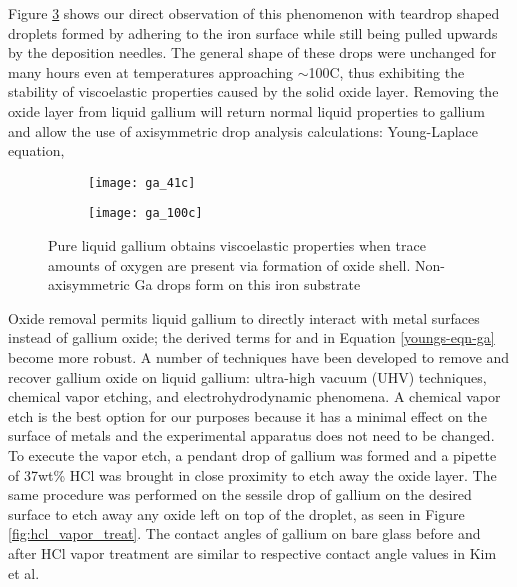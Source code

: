 Figure \ref{fig:deformed_ga} shows our direct observation of this phenomenon with teardrop shaped droplets formed by adhering to the iron surface while still being pulled upwards by the deposition needles. The general shape of these drops were unchanged for many hours even at temperatures approaching $\sim$100\degree C, thus exhibiting the stability of viscoelastic properties caused by the solid oxide layer. Removing the oxide layer from liquid gallium will return normal liquid properties to gallium and allow the use of axisymmetric drop analysis calculations: Young-Laplace equation, 

\begin{figure}[h]
	\centering
	\begin{subfigure}[c]{0.35\textwidth}
		\texttt{[image: ga\_41c]}
		\subcaption{~}
		\label{fig:ga_41c}		
	\end{subfigure}
	\begin{subfigure}[c]{0.37\textwidth} 
		\texttt{[image: ga\_100c]}
		\subcaption{~}
		\label{fig:ga_100c}		
	\end{subfigure}
	\caption{Pure liquid gallium obtains viscoelastic properties when trace amounts of oxygen are present via formation of oxide shell. Non-axisymmetric Ga drops form on this iron substrate}
	\label{fig:deformed_ga}
\end{figure}

Oxide removal permits liquid gallium to directly interact with metal surfaces instead of gallium oxide; the derived terms for \gamSL and \gamLV in Equation \ref{youngs-eqn-ga} become more robust. A number of techniques have been developed to remove and recover gallium oxide on liquid gallium: ultra-high vacuum (UHV) techniques,\cite{Regan1995,Regan1997} chemical vapor etching,\cite{Kim2013,Doudrick2014} and electrohydrodynamic phenomena.\cite{Khan2014} A chemical vapor etch is the best option for our purposes because it has a minimal effect on the surface of metals and the experimental apparatus does not need to be changed. To execute the vapor etch, a pendant drop of gallium was formed and a pipette of 37wt\% HCl was brought in close proximity to etch away the oxide layer. The same procedure was performed on the sessile drop of gallium on the desired surface to etch away any oxide left on top of the droplet, as seen in Figure \ref{fig:hcl_vapor_treat}. The contact angles of gallium on bare glass before and after HCl vapor treatment are similar to respective contact angle values in Kim et al.\cite{Kim2013}

